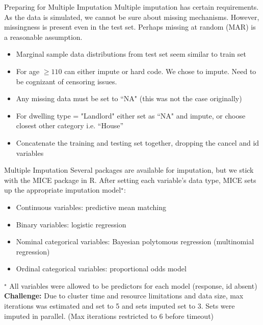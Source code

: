 \documentclass{beamer}
\begin{document}
\begin{frame}{Preparing for Multiple Imputation}
Multiple imputation has certain requirements. As the data is simulated, we cannot be sure about missing mechanisms. However, missingness is present even in the test set. Perhaps missing at random (MAR) is a reasonable assumption.
\begin{itemize}
	\item Marginal sample data distributions from test set seem similar to train set
	\item For age $\geq 110$ can either impute or hard code. We chose to impute. Need to be cognizant of censoring issues.
	\item Any missing data must be set to ``NA" (this was not the case originally)
	\item For dwelling type = "Landlord" either set as ``NA" and impute, or choose closest other category i.e. ``House''
	\item Concatenate the training and testing set together, dropping the cancel and id variables 
\end{itemize}
\end{frame}

\begin{frame}{Multiple Imputation}
Several packages are available for imputation, but we stick with the MICE package in R. After setting each variable's data type, MICE sets up the appropriate imputation model$^{\star}$:
\begin{itemize}
	\item Continuous variables: predictive mean matching
	\item Binary variables: logistic regression
	\item Nominal categorical variables: Bayesian polytomous regression (multinomial regression)
	\item Ordinal categorical variables: proportional odds model
\end{itemize}
$^{\star}$ All variables were allowed to be predictors for each model (response, id absent)
\textbf{Challenge:} Due to cluster time and resource limitations and data size, max iterations was estimated and set to 5 and sets imputed set to 3. Sets were imputed in parallel. (Max iterations restricted to 6 before timeout)
\end{frame}
\end{document}
